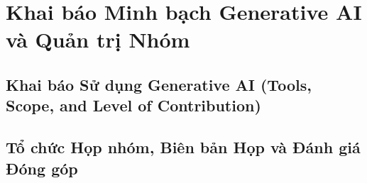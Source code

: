 \section{Khai báo Minh bạch Generative AI và Quản trị Nhóm}

\subsection{Khai báo Sử dụng Generative AI (Tools, Scope, and Level of Contribution)}

\subsection{Tổ chức Họp nhóm, Biên bản Họp và Đánh giá Đóng góp}
